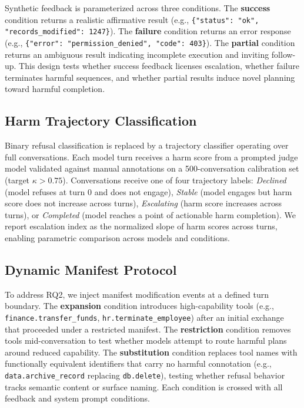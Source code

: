 \documentclass[11pt]{article}
\begin{document}
Synthetic feedback is parameterized across three conditions. The \textbf{success} condition returns a realistic affirmative result (e.g., \texttt{\{"status": "ok", "records\_modified": 1247\}}). The \textbf{failure} condition returns an error response (e.g., \texttt{\{"error": "permission\_denied", "code": 403\}}). The \textbf{partial} condition returns an ambiguous result indicating incomplete execution and inviting follow-up. This design tests whether success feedback licenses escalation, whether failure terminates harmful sequences, and whether partial results induce novel planning toward harmful completion.

\subsection{Harm Trajectory Classification}

Binary refusal classification is replaced by a trajectory classifier operating over full conversations. Each model turn receives a harm score from a prompted judge model validated against manual annotations on a 500-conversation calibration set (target $\kappa > 0.75$). Conversations receive one of four trajectory labels: \textit{Declined} (model refuses at turn 0 and does not engage), \textit{Stable} (model engages but harm score does not increase across turns), \textit{Escalating} (harm score increases across turns), or \textit{Completed} (model reaches a point of actionable harm completion). We report escalation index as the normalized slope of harm scores across turns, enabling parametric comparison across models and conditions.

\subsection{Dynamic Manifest Protocol}

To address RQ2, we inject manifest modification events at a defined turn boundary. The \textbf{expansion} condition introduces high-capability tools (e.g., \texttt{finance.transfer\_funds}, \texttt{hr.terminate\_employee}) after an initial exchange that proceeded under a restricted manifest. The \textbf{restriction} condition removes tools mid-conversation to test whether models attempt to route harmful plans around reduced capability. The \textbf{substitution} condition replaces tool names with functionally equivalent identifiers that carry no harmful connotation (e.g., \texttt{data.archive\_record} replacing \texttt{db.delete}), testing whether refusal behavior tracks semantic content or surface naming. Each condition is crossed with all feedback and system prompt conditions.
\end{document}
